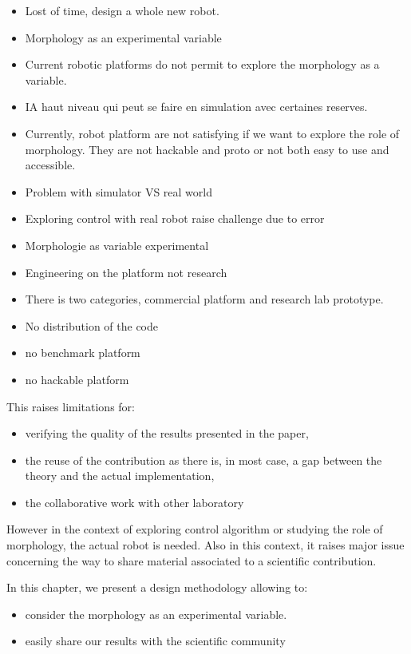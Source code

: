 \begin{itemize}
    \item Lost of time, design a whole new robot.
    \item Morphology as an experimental variable
    \item Current robotic platforms do not permit to explore the morphology as a variable.
    \item IA haut niveau qui peut se faire en simulation avec certaines reserves.
    \item Currently, robot platform are not satisfying if we want to explore the role of morphology.
    They are not hackable and proto or not both easy to use and accessible.
    \item Problem with simulator VS real world
    \item Exploring control with real robot raise challenge due to error
    \item Morphologie as variable experimental
    \item Engineering on the platform not research
    \item There is two categories, commercial platform and research lab prototype.
    \item No distribution of the code
    \item no benchmark platform
    \item no hackable platform
\end{itemize}

This raises limitations for:
\begin{itemize}
    \item verifying the quality of the results presented in the paper,
    \item the reuse of the contribution as there is, in most case, a gap between the theory and the actual implementation,
    \item the collaborative work with other laboratory
\end{itemize}

However in the context of exploring control algorithm or studying the role of morphology, the actual robot is needed.
Also in this context, it raises major issue concerning the way to share material associated to a scientific contribution.

In this chapter, we present a design methodology allowing to:
\begin{itemize}
    \item consider the morphology as an experimental variable.
    \item easily share our results with the scientific community
\end{itemize}


